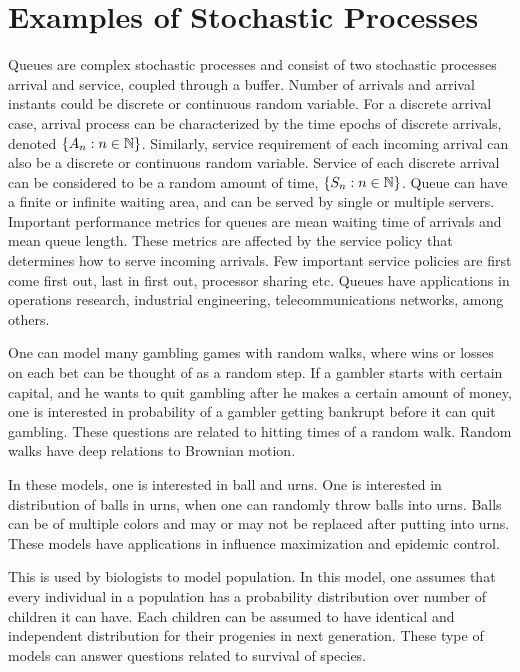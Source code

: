 \documentclass[a4paper,10pt,english]{article}
\begin{document}
\section{Examples of Stochastic Processes}
\begin{exmp}[Queues] Queues are complex stochastic processes and consist of two stochastic processes arrival and service, coupled through a buffer. 
Number of arrivals and arrival instants could be discrete or continuous random variable. 
For a discrete arrival case, arrival process can be characterized by the time epochs of discrete arrivals, denoted $\{A_n: n \in \mathbb{N} \}$. 
Similarly, service requirement of each incoming arrival can also be a discrete or continuous random variable.
Service of each discrete arrival can be considered to be a random amount of time, $\{S_n: n \in \mathbb{N}\}$. 
Queue can have a finite or infinite waiting area, and can be served by single or multiple servers. 
Important performance metrics for queues are mean waiting time of arrivals and mean queue length. 
These metrics are affected by the service policy that determines how to serve incoming arrivals. 
Few important service policies are first come first out, last in first out, processor sharing etc.
Queues have applications in operations research, industrial engineering, telecommunications networks, among others. 
\end{exmp}
\begin{exmp} One can model many gambling games with random walks, where wins or losses on each bet can be thought of as a random step. If a gambler starts with certain capital, and he wants to quit gambling after he makes a certain amount of money, one is interested in probability of a gambler getting bankrupt before it can quit gambling. These questions are related to hitting times of a random walk. Random walks have deep relations to Brownian motion.
\end{exmp}
\begin{exmp} In these models, one is interested in ball and urns. One is interested in distribution of balls in urns, when one can randomly throw balls into urns. Balls can be of multiple colors and may or may not be replaced after putting into urns. These models have applications in influence maximization and epidemic control.
\end{exmp}
\begin{exmp} This is used by biologists to model population. In this model, one assumes that every individual in a population has a probability distribution over number of children it can have. Each children can be assumed to have identical and independent distribution for their progenies in next generation. These type of models can answer questions related to survival of species.
\end{exmp}
\end{document}
